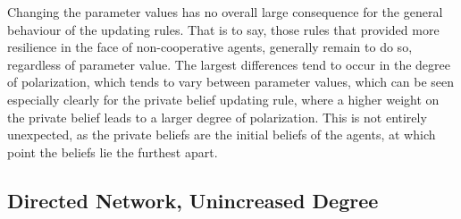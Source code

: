 \documentclass[a4paper, 12pt]{report}
\begin{document}
Changing the parameter values has no overall large consequence for the general behaviour of the updating rules. That is to say, those rules that provided more resilience in the face of non-cooperative agents, generally remain to do so, regardless of parameter value. The largest differences tend to occur in the degree of polarization, which tends to vary between parameter values, which can be seen especially clearly for the private belief updating rule, where a higher weight on the private belief leads to a larger degree of polarization. This is not entirely unexpected, as the private beliefs are the initial beliefs of the agents, at which point the beliefs lie the furthest apart.

\newpage


\subsection{Directed Network, Unincreased Degree}
\end{document}
